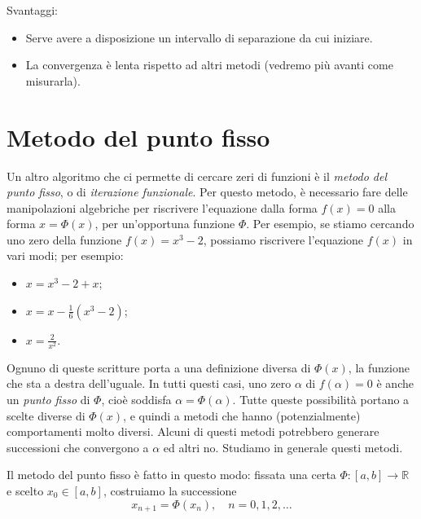 \documentclass[a4paper]{report}
\theoremstyle{definiton}
\theoremstyle{remark}
\begin{document}
Svantaggi:

\begin{itemize}
    \item Serve avere a disposizione un intervallo di separazione da cui iniziare.
    \item La convergenza è lenta rispetto ad altri metodi (vedremo più avanti come misurarla).
\end{itemize}


\section{Metodo del punto fisso}

Un altro algoritmo che ci permette di cercare zeri di funzioni è il \emph{metodo del punto fisso}, o di \emph{iterazione funzionale}. Per questo metodo, è necessario fare delle manipolazioni algebriche per riscrivere l'equazione dalla forma $f(x) = 0$ alla forma $x = \Phi(x)$, per un'opportuna funzione $\Phi$. Per esempio, se stiamo cercando uno zero della funzione $f(x) = x^3 - 2$, possiamo riscrivere l'equazione $f(x)$ in vari modi; per esempio: 
\begin{itemize}
    \item $x = x^3 - 2 + x$;
    \item $x = x - \frac16 (x^3-2)$;
    \item $x = \frac{2}{x^2}$.
\end{itemize}
Ognuno di queste scritture porta a una definizione diversa di $\Phi(x)$, la funzione che sta a destra dell'uguale. In tutti questi casi, uno zero $\alpha$ di $f(\alpha)=0$ è anche un \emph{punto fisso} di $\Phi$, cioè soddisfa $\alpha = \Phi(\alpha)$. Tutte queste possibilità portano a scelte diverse di $\Phi(x)$, e quindi a metodi che hanno (potenzialmente) comportamenti molto diversi. Alcuni di questi metodi potrebbero generare successioni che convergono a $\alpha$ ed altri no. Studiamo in generale questi metodi.

Il metodo del punto fisso è fatto in questo modo: fissata una certa $\Phi:[a,b] \to \mathbb{R}$ e scelto $x_0 \in [a,b]$, costruiamo la successione
\begin{equation} \label{puntofisso}
    x_{n+1} = \Phi(x_n), \quad n=0,1,2,\dots    
\end{equation}
\end{document}
